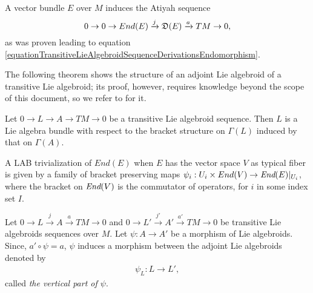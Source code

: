 \begin{example}
A vector bundle $E$ over $M$ induces the Atiyah sequence
\begin{equation}
0 \to 0 \to End(E) \xrightarrow{j} \mathfrak{D}(E)  \xrightarrow{a} TM \to 0,
\end{equation}
 as was proven leading to equation \eqref{equationTransitiveLieAlgebroidSequenceDerivationsEndomorphism}.
\end{example}

The following theorem shows the structure of an adjoint Lie algebroid of a transitive Lie algebroid; its proof, however, requires knowledge beyond the scope of this document, so we refer to \cite{Mackenzie2005} for it.
\begin{theorem}\label{theoAdjtructure of ointLAB} %
Let $0 \to L \to A \to  TM \to 0$ be a transitive Lie algebroid sequence. Then $L$ is a Lie algebra bundle with respect to the bracket structure on $\Gamma(L)$ induced by that on $\Gamma(A)$.
\end{theorem}

\begin{example}
A LAB trivialization of $End(E)$ when $E$ has the vector space $V$ as typical fiber is given by a family of bracket preserving maps $\psi_i: U_i \times End(V) \to \operatorname{\textit{End}}(E)|_{U_i}$, where the bracket on $\operatorname{\textit{End}}(V)$ is the commutator of operators, for $i$ in some index set $I$.
\end{example}

\begin{definition}\label{defnPhi+}
Let $0 \to L \xrightarrow{j} A \xrightarrow{a} TM \to 0$ and $0 \to L' \xrightarrow{j'} A' \xrightarrow{a'} TM \to 0$ be transitive Lie algebroids sequences over $M$. Let $\psi: A \to A'$ be a morphism of Lie algebroids. Since, $a' \circ \psi = a$, $\psi$ induces a morphism between the adjoint Lie algebroids denoted by
\begin{align*}
    \psi_L: L \to L',
\end{align*}
called \emph{the vertical part of $\psi$}.
\end{definition}

